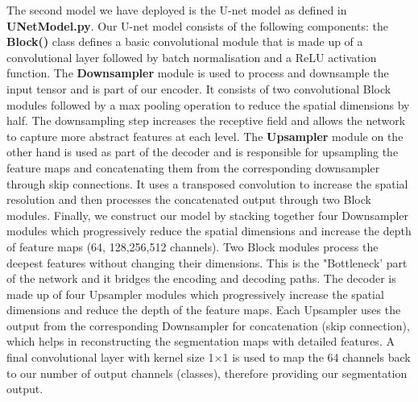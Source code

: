 The second model we have deployed is the U-net model as defined in \textbf{UNetModel.py}. Our U-net model consists of the following components: the \textbf{Block()} class defines a basic convolutional module that is made up of a convolutional layer followed by batch normalisation and a ReLU activation function. The \textbf{Downsampler} module is used to process and downsample the input tensor and is part of our encoder. It consists of two convolutional Block modules followed by a max pooling operation to reduce the spatial dimensions by half. The downsampling step increases the receptive field and allows the network to capture more abstract features at each level. The \textbf{Upsampler} module on the other hand is used as part of the decoder and is responsible for upsampling the feature maps and concatenating them from the corresponding downsampler through skip connections. It uses a transposed convolution to increase the spatial resolution and then processes the concatenated output through two Block modules. Finally, we construct our model by stacking together four Downsampler modules which progressively reduce the spatial dimensions and increase the depth of feature maps (64, 128,256,512 channels). Two Block modules process the deepest features without changing their dimensions. This is the "Bottleneck' part of the network and it bridges the encoding and decoding paths. The decoder is made up of four Upsampler modules which progressively increase the spatial dimensions and reduce the depth of the feature maps. Each Upsampler uses the output from the corresponding Downsampler for concatenation (skip connection), which helps in reconstructing the segmentation maps with detailed features. A final convolutional layer with kernel size 1$\times$1 is used to map the 64 channels back to our number of output channels (classes), therefore providing our segmentation output. 
















